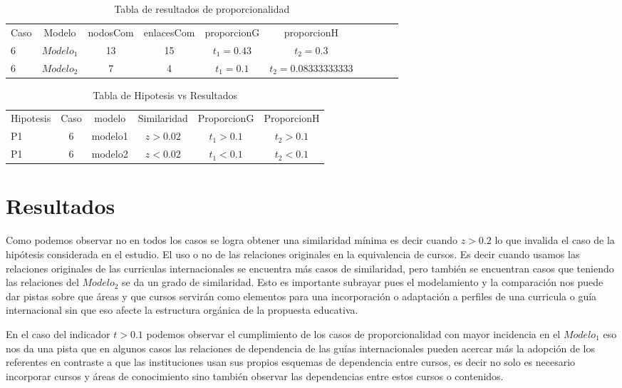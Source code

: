 \begin{table}[H]
\centering
\caption{Tabla de resultados de proporcionalidad}
\begin{tabular}[t]{lccccccccc}
\hline
Caso & Modelo & nodosCom & enlacesCom & proporcionG &proporcionH \\
6 & $Modelo_1$ & 13 & 15 & $t_1=0.43$ & $t_2=0.3$\\
6 & $Modelo_2$ & 7 & 4 & $t_1=0.1$ & $t_2=0.08333333333$\\
\hline
\end{tabular}
\label{tab:tabresultados2_C5_P1}
\end{table}

\begin{table}[H]
\centering
\caption{Tabla de Hipotesis vs Resultados }
\begin{tabular}[t]{lccccc}
\hline
Hipotesis & Caso & modelo & Similaridad & ProporcionG & ProporcionH\\
P1 & 6 & modelo1 &$z>0.02$&$t_1>0.1$&$t_2>0.1$\\
P1 & 6 & modelo2 &$z<0.02$&$t_1<0.1$&$t_2<0.1$\\
\hline
\end{tabular}
\label{tab:hipotesis_C6}
\end{table}



\section{Resultados}

Como podemos observar no en todos los casos se logra obtener una similaridad mínima es decir cuando $z > 0.2 $ lo que invalida el caso de la hipótesis considerada en el estudio. El uso o no de las relaciones originales en la equivalencia de cursos. Es decir cuando usamos las relaciones originales de las curriculas internacionales se encuentra más casos de similaridad, pero también se encuentran casos que teniendo las relaciones del $Modelo_2$ se da un grado de similaridad. Esto es importante subrayar pues el modelamiento y la comparación nos puede dar pistas sobre que áreas y que cursos servirán como elementos para una incorporación o adaptación a perfiles de una curricula o guía internacional sin que eso afecte la estructura orgánica de la propuesta educativa.

En el caso del indicador $t > 0.1$ podemos observar el cumplimiento de los casos de proporcionalidad con mayor incidencia en el $Modelo_1$ eso nos da una pista que en algunos casos las relaciones de dependencia de las guías internacionales pueden acercar más la adopción de los referentes en contraste a que las instituciones usan sus propios esquemas de dependencia entre cursos, es decir no solo es necesario incorporar cursos y áreas de conocimiento sino también observar las dependencias entre estos cursos o contenidos. 


